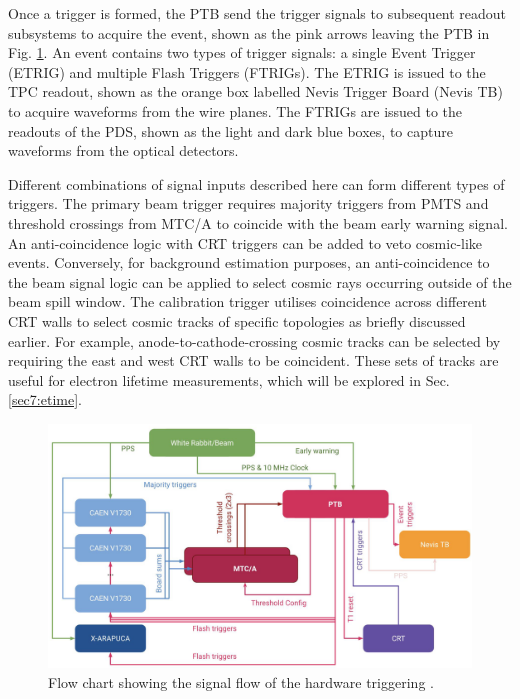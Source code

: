 Once a trigger is formed, the PTB send the trigger signals to subsequent readout subsystems to acquire the event, shown as the pink arrows leaving the PTB in Fig. \ref{fig:SBND_Trigger}.                                                                           
An event contains two types of trigger signals: a single Event Trigger (ETRIG) and multiple Flash Triggers (FTRIGs).                                                                        
The ETRIG is issued to the TPC readout, shown as the orange box labelled Nevis Trigger Board (Nevis TB) to acquire waveforms from the wire planes.                                          
The FTRIGs are issued to the readouts of the PDS, shown as the light and dark blue boxes, to capture waveforms from the optical detectors.                                                  
                                                                                                                                                                                            
Different combinations of signal inputs described here can form different types of triggers.                                                                                                
The primary beam trigger requires majority triggers from PMTS and threshold crossings from MTC/A to coincide with the beam early warning signal.                                            
An anti-coincidence logic with CRT triggers can be added to veto cosmic-like events.
Conversely, for background estimation purposes, an anti-coincidence to the beam signal logic can be applied to select cosmic rays occurring outside of the beam spill window.
The calibration trigger utilises coincidence across different CRT walls to select cosmic tracks of specific topologies as briefly discussed earlier.
For example, anode-to-cathode-crossing cosmic tracks can be selected by requiring the east and west CRT walls to be coincident.
These sets of tracks are useful for electron lifetime measurements, which will be explored in Sec. \ref{sec7:etime}.

\begin{figure}[tbp] 
\centering    
\includegraphics[width=1.0\textwidth]{SBND_Trigger}
\caption[Hardware Triggering Flow Chart]{
Flow chart showing the signal flow of the hardware triggering \cite{ptb_gvs}.
}
\label{fig:SBND_Trigger}
\end{figure}


